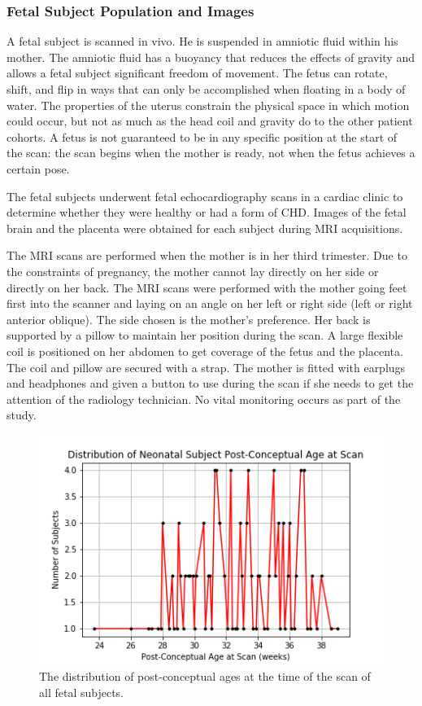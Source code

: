 \subsubsection{Fetal Subject Population and Images}


A fetal subject is scanned in vivo. He is suspended in amniotic fluid within his mother. The amniotic fluid has a buoyancy that reduces the effects of gravity and allows a fetal subject significant freedom of movement. The fetus can rotate, shift, and flip in ways that can only be accomplished when floating in a body of water. The properties of the uterus constrain the physical space in which motion could occur, but not as much as the head coil and gravity do to the other patient cohorts. A fetus is not guaranteed to be in any specific position at the start of the scan: the scan begins when the mother is ready, not when the fetus achieves a certain pose. 

The fetal subjects underwent fetal echocardiography scans in a cardiac clinic to determine whether they were healthy or had a form of CHD. Images of the fetal brain and the placenta were obtained for each subject during MRI acquisitions.

The MRI scans are performed when the mother is in her third trimester. Due to the constraints of pregnancy, the mother cannot lay directly on her side or directly on her back. The MRI scans were performed with the mother going feet first into the scanner and laying on an angle on her left or right side (left or right anterior oblique). The side chosen is the mother's preference. Her back is supported by a pillow to maintain her position during the scan. A large flexible coil is positioned on her abdomen to get coverage of the fetus and the placenta. The coil and pillow are secured with a strap. The mother is fitted with earplugs and headphones and given a button to use during the scan if she needs to get the attention of the radiology technician. No vital monitoring occurs as part of the study.

\begin{figure}
\centering
\includegraphics[width=.75\textwidth]{5/demo_fetal_scan_pca.png}
\caption{The distribution of post-conceptual ages at the time of the scan of all fetal subjects.}
\label{ch5:fetal:scanpca}
\end{figure}

